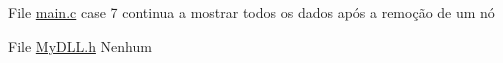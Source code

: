 
\begin{DoxyRefList}
\item[File \mbox{\hyperlink{main_8c}{main.c}} ]\label{bug__bug000001}%
%
case 7 continua a mostrar todos os dados após a remoção de um nó 
\item[File \mbox{\hyperlink{MyDLL_8h}{My\+DLL.h}} ]\label{bug__bug000002}%
%
Nenhum 
\end{DoxyRefList}